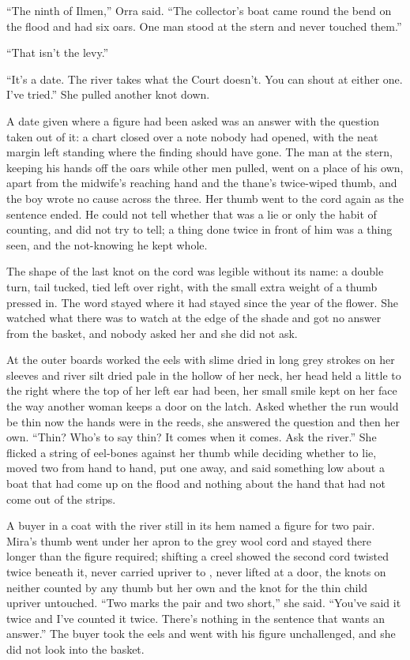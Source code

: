 “The ninth of Ilmen,” Orra said. “The collector's boat came round the bend on the flood and had six oars. One man stood at the stern and never touched them.”

“That isn't the levy.”

“It's a date. The river takes what the Court doesn't. You can shout at either one. I've tried.” She pulled another knot down.

A date given where a figure had been asked was an answer with the question taken out of it: a chart closed over a note nobody had opened, with the neat margin left standing where the finding should have gone. The man at the stern, keeping his hands off the oars while other men pulled, went on a place of his own, apart from the midwife's reaching hand and the thane's twice-wiped thumb, and the boy wrote no cause across the three. Her thumb went to the cord again as the sentence ended. He could not tell whether that was a lie or only the habit of counting, and did not try to tell; a thing done twice in front of him was a thing seen, and the not-knowing he kept whole.

The shape of the last knot on the cord was legible without its name: a double turn, tail tucked, tied left over right, with the small extra weight of a thumb pressed in. The word stayed where it had stayed since the year of the flower. She watched what there was to watch at the edge of the shade and got no answer from the basket, and nobody asked her and she did not ask.

At the outer boards  worked the eels with slime dried in long grey strokes on her sleeves and river silt dried pale in the hollow of her neck, her head held a little to the right where the top of her left ear had been, her small smile kept on her face the way another woman keeps a door on the latch. Asked whether the run would be thin now the hands were in the reeds, she answered the question and then her own. “Thin? Who's to say thin? It comes when it comes. Ask the river.” She flicked a string of eel-bones against her thumb while deciding whether to lie, moved two from hand to hand, put one away, and said something low about a boat that had come up on the flood and nothing about the hand that had not come out of the strips.

A buyer in a coat with the river still in its hem named a figure for two pair. Mira's thumb went under her apron to the grey wool cord and stayed there longer than the figure required; shifting a creel showed the second cord twisted twice beneath it, never carried upriver to , never lifted at a door, the knots on neither counted by any thumb but her own and the knot for the thin child upriver untouched. “Two marks the pair and two short,” she said. “You've said it twice and I've counted it twice. There's nothing in the sentence that wants an answer.” The buyer took the eels and went with his figure unchallenged, and she did not look into the basket.

